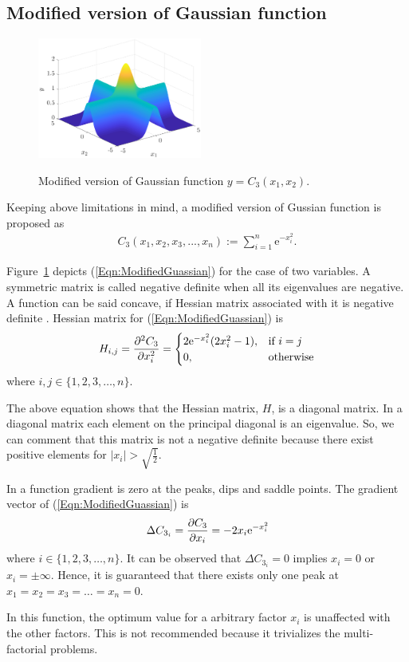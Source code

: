 \documentclass[twocolumn]{svjour3}          %
\newcommand{\me}{\mathrm{e}}
\begin{document}
\subsection{Modified version of Gaussian function}
\begin{figure}
	\centering
	\includegraphics[width=0.48\textwidth]{images/2GussianFunctionModified}
	\label{Fig:2GussianFunctionModified}
	\caption{Modified version of Gaussian function $y=C_3(x_1, x_2)$.}
\end{figure}
Keeping above limitations in mind, a modified version of Gussian function is proposed as
\begin{eqnarray}
	C_3(x_1, x_2, x_3, ..., x_n) := \sum_{i=1}^{n}{\me^{-x_i^2}}. \label{Eqn:ModifiedGuassian}
\end{eqnarray}
\par
Figure~\ref{Fig:2GussianFunctionModified} depicts (\ref{Eqn:ModifiedGuassian}) for the case of two variables. A symmetric matrix is called negative definite when all its eigenvalues are negative. A function can be said concave, if Hessian matrix associated with it is negative definite \cite{bernstein1962some}. Hessian matrix for (\ref{Eqn:ModifiedGuassian}) is 
\begin{eqnarray}
	H_{i,j} = \pdv[2]{C_3}{x_i} =
	\begin{cases}
		2\me^{-x_i^2}(2x_i^2-1)	,	& \text{if } i = j\\
		0						,	& \text{otherwise}
	\end{cases} \label{Eqn:HessianMatrix}
\end{eqnarray}
where $i, j \in \{1, 2, 3, \dots, n\}$.
\par
The above equation shows that the Hessian matrix, $H$, is a diagonal matrix. In a diagonal matrix each element on the principal diagonal is an eigenvalue. So, we can comment that this matrix is not a negative definite because there exist positive elements for $|x_i|>\sqrt{\frac{1}{2}}$.
\par
In a function gradient is zero at the peaks, dips and saddle points. The gradient vector of (\ref{Eqn:ModifiedGuassian}) is
\begin{eqnarray}
	\Delta C_{3_i} = \pdv{C_3}{x_i} = -2x_i\me^{-x_i^2} \label{Eqn:GradientModifiedGuassian}
\end{eqnarray}
where $i \in \{1, 2, 3, \dots, n\}$. It can be observed that $\Delta C_{3_i} = 0$ implies $x_i =0$ or $x_i=\pm\infty$. Hence, it is guaranteed that there exists only one peak at $x_1 = x_2 = x_3 = \dots = x_n = 0$.
\par
In this function, the optimum value for a arbitrary factor $x_i$ is unaffected with the other factors. This is not recommended because it trivializes the multi-factorial problems.
\end{document}
